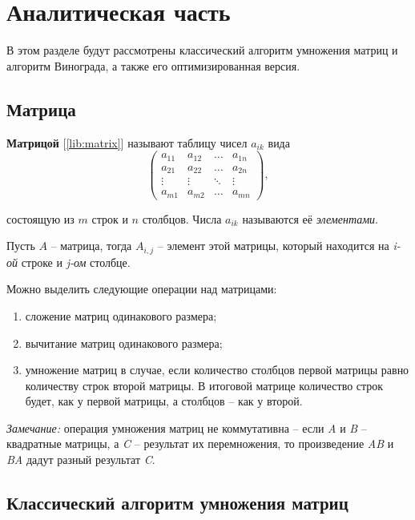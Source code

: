 \chapter{Аналитическая часть}

В этом разделе будут рассмотрены классический алгоритм умножения матриц и алгоритм Винограда, а также его оптимизированная версия.

\section{Матрица}

\textbf{Матрицой} [\ref{lib:matrix}] называют таблицу чисел $a_{ik}$ вида
\begin{equation}
	\begin{pmatrix}
		a_{11} & a_{12} & \ldots & a_{1n}\\
		a_{21} & a_{22} & \ldots & a_{2n}\\
		\vdots & \vdots & \ddots & \vdots\\
		a_{m1} & a_{m2} & \ldots & a_{mn}
	\end{pmatrix},
\end{equation}

состоящую из $m$ строк и $n$ столбцов. Числа $a_{ik}$ называются её \textit{элементами}.

Пусть $A$ -- матрица, тогда $A_{i,j}$ -- элемент этой матрицы, который находится на \textit{i-ой} строке и \textit{j-ом} столбце.

Можно выделить следующие операции над матрицами:
\begin{enumerate}[label=\arabic*)]
	\item сложение матриц одинакового размера;
	\item вычитание матриц одинакового размера;
	\item умножение матриц в случае, если количество столбцов первой матрицы равно количеству строк второй матрицы. В итоговой матрице количество строк будет, как у первой матрицы, а столбцов -- как у второй. \newline
\end{enumerate}

\textit{Замечание:} операция умножения матриц не коммутативна -- если \textit{A} и \textit{B} -- квадратные матрицы, а \textit{C} -- результат их перемножения, то произведение \textit{AB} и \textit{BA} дадут разный результат \textit{C}.

\section{Классический алгоритм умножения матриц}

